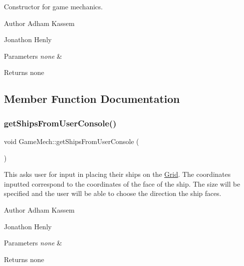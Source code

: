Constructor for game mechanics. \begin{DoxyAuthor}{Author}
Adham Kassem 

Jonathon Henly 
\end{DoxyAuthor}

\begin{DoxyParams}{Parameters}
{\em none} & \\
\hline
\end{DoxyParams}
\begin{DoxyReturn}{Returns}
none 
\end{DoxyReturn}


\subsection{Member Function Documentation}
\mbox{\label{classGameMech_acd8210b1f72b612ac0f1c3fad6d4a1da}} 
\subsubsection{\texorpdfstring{get\+Ships\+From\+User\+Console()}{getShipsFromUserConsole()}}
{\footnotesize\ttfamily void Game\+Mech\+::get\+Ships\+From\+User\+Console (\begin{DoxyParamCaption}{ }\end{DoxyParamCaption})\hspace{0.3cm}{\ttfamily [inline]}}

This asks user for input in placing their ships on the \hyperlink{classGrid}{Grid}. The coordinates inputted correspond to the coordinates of the face of the ship. The size will be specified and the user will be able to choose the direction the ship faces.

\begin{DoxyAuthor}{Author}
Adham Kassem 

Jonathon Henly 
\end{DoxyAuthor}

\begin{DoxyParams}{Parameters}
{\em none} & \\
\hline
\end{DoxyParams}
\begin{DoxyReturn}{Returns}
none 
\end{DoxyReturn}
\mbox{\label{classGameMech_a92543cf17b1dab64543d3d08c6ea621b}} 
